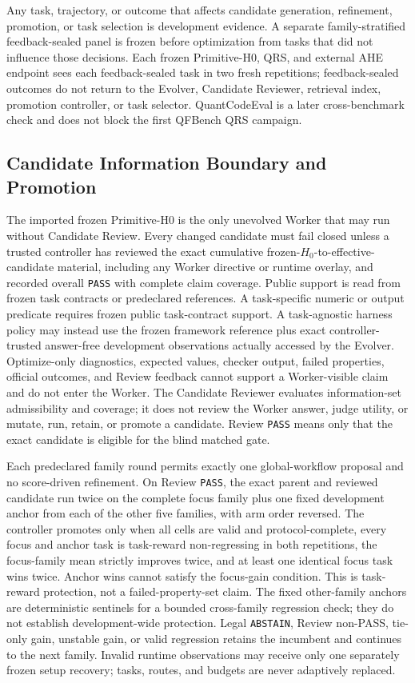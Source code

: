 Any task, trajectory, or outcome that affects candidate generation,
refinement, promotion, or task selection is development evidence. A separate
family-stratified feedback-sealed panel is frozen before optimization from
tasks that did not influence those decisions. Each frozen Primitive-H0, QRS,
and external AHE
endpoint sees each feedback-sealed task in two fresh repetitions;
feedback-sealed outcomes do not return to the
Evolver, Candidate Reviewer, retrieval index, promotion controller, or task
selector. QuantCodeEval is a later cross-benchmark check and does not block the
first QFBench QRS campaign.

\subsection{Candidate Information Boundary and Promotion}

The imported frozen Primitive-H0 is the only unevolved Worker that may run without Candidate
Review. Every changed candidate must fail closed unless a trusted controller
has reviewed the exact cumulative frozen-$H_0$-to-effective-candidate material,
including any Worker directive or runtime overlay, and recorded overall
\texttt{PASS} with complete claim coverage. Public support is read from frozen
task contracts or predeclared references. A task-specific numeric or output
predicate requires frozen public task-contract support. A task-agnostic harness
policy may instead use the frozen framework reference plus exact controller-
trusted answer-free development observations actually accessed by the Evolver.
Optimize-only diagnostics, expected values, checker output, failed properties,
official outcomes, and Review feedback cannot support a Worker-visible claim
and do not enter the Worker. The Candidate Reviewer evaluates information-set
admissibility and coverage; it does not review the Worker answer, judge utility,
or mutate, run, retain, or promote a candidate. Review \texttt{PASS} means only
that the exact candidate is eligible for the blind matched gate.

Each predeclared family round permits exactly one global-workflow proposal and
no score-driven refinement. On Review \texttt{PASS}, the exact parent and
reviewed candidate run twice on the complete focus family plus one fixed
development anchor from each of the other five families, with arm order
reversed. The controller promotes only when all cells are valid and
protocol-complete, every focus and anchor task is task-reward non-regressing in
both repetitions, the focus-family mean strictly improves twice, and at least
one identical focus task wins twice. Anchor wins cannot satisfy the focus-gain
condition. This is task-reward protection, not a failed-property-set claim.
The fixed other-family anchors are deterministic sentinels for a bounded
cross-family regression check; they do not establish development-wide
protection.
Legal \texttt{ABSTAIN}, Review non-PASS, tie-only gain, unstable gain, or valid
regression retains the incumbent and continues to the next family. Invalid
runtime observations may receive only one separately frozen setup recovery;
tasks, routes, and budgets are never adaptively replaced.

